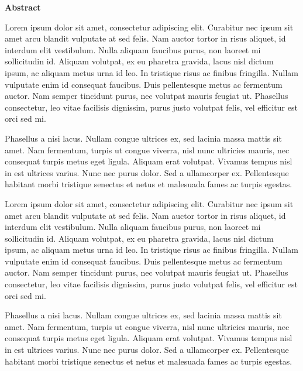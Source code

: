 \newpage
\thispagestyle{empty}
{\fontsize{16pt}{20pt}\selectfont \textbf{Abstract} \par}


Lorem ipsum dolor sit amet, consectetur adipiscing elit. Curabitur nec ipsum sit amet arcu blandit vulputate at sed felis. Nam auctor tortor in risus aliquet, id interdum elit vestibulum. Nulla aliquam faucibus purus, non laoreet mi sollicitudin id. Aliquam volutpat, ex eu pharetra gravida, lacus nisl dictum ipsum, ac aliquam metus urna id leo. In tristique risus ac finibus fringilla. Nullam vulputate enim id consequat faucibus. Duis pellentesque metus ac fermentum auctor. Nam semper tincidunt purus, nec volutpat mauris feugiat ut. Phasellus consectetur, leo vitae facilisis dignissim, purus justo volutpat felis, vel efficitur est orci sed mi.

Phasellus a nisi lacus. Nullam congue ultrices ex, sed lacinia massa mattis sit amet. Nam fermentum, turpis ut congue viverra, nisl nunc ultricies mauris, nec consequat turpis metus eget ligula. Aliquam erat volutpat. Vivamus tempus nisl in est ultrices varius. Nunc nec purus dolor. Sed a ullamcorper ex. Pellentesque habitant morbi tristique senectus et netus et malesuada fames ac turpis egestas.

Lorem ipsum dolor sit amet, consectetur adipiscing elit. Curabitur nec ipsum sit amet arcu blandit vulputate at sed felis. Nam auctor tortor in risus aliquet, id interdum elit vestibulum. Nulla aliquam faucibus purus, non laoreet mi sollicitudin id. Aliquam volutpat, ex eu pharetra gravida, lacus nisl dictum ipsum, ac aliquam metus urna id leo. In tristique risus ac finibus fringilla. Nullam vulputate enim id consequat faucibus. Duis pellentesque metus ac fermentum auctor. Nam semper tincidunt purus, nec volutpat mauris feugiat ut. Phasellus consectetur, leo vitae facilisis dignissim, purus justo volutpat felis, vel efficitur est orci sed mi.

Phasellus a nisi lacus. Nullam congue ultrices ex, sed lacinia massa mattis sit amet. Nam fermentum, turpis ut congue viverra, nisl nunc ultricies mauris, nec consequat turpis metus eget ligula. Aliquam erat volutpat. Vivamus tempus nisl in est ultrices varius. Nunc nec purus dolor. Sed a ullamcorper ex. Pellentesque habitant morbi tristique senectus et netus et malesuada fames ac turpis egestas.

\newpage
